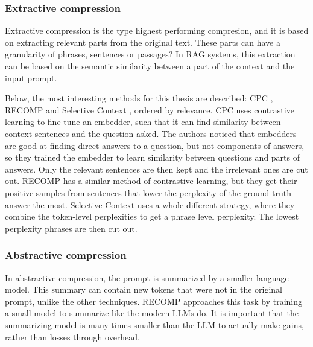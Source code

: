 \subsubsection{Extractive compression}
Extractive compression is the type highest performing compresion, and it is based on extracting relevant parts from the original text. These parts can have a granularity of phrases, sentences or passages? In RAG systems, this extraction can be based on the semantic similarity between a part of the context and the input prompt. 

Below, the most interesting methods for this thesis are described: CPC \cite{liskavets2025cpc}, RECOMP \cite{xu2023recomp} and Selective Context \cite{li2023selectivecontext}, ordered by relevance. CPC uses contrastive learning to fine-tune an embedder, such that it can find similarity between context sentences and the question asked. The authors noticed that embedders are good at finding direct answers to a question, but not components of answers, so they trained the embedder to learn similarity between questions and parts of answers. Only the relevant sentences are then kept and the irrelevant ones are cut out. RECOMP has a similar method of contrastive learning, but they get their positive samples from sentences that lower the perplexity of the ground truth answer the most. Selective Context uses a whole different strategy, where they combine the token-level perplexities to get a phrase level perplexity. The lowest perplexity phrases are then cut out.

\subsubsection{Abstractive compression}
In abstractive compression, the prompt is summarized by a smaller language model. This summary can contain new tokens that were not in the original prompt, unlike the other techniques. RECOMP \cite{xu2023recomp} approaches this task by training a small model to summarize like the modern LLMs do. It is important that the summarizing model is many times smaller than the LLM to actually make gains, rather than losses through overhead.

